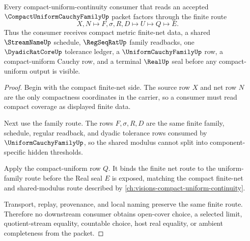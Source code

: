 \begin{theorem}
\label{thm:compact-uniform-cauchy-family-vision-route}
Every compact-uniform-continuity consumer that reads an accepted $\CompactUniformCauchyFamilyUp$ packet factors through the finite route
$$
X,N \longmapsto F,\sigma,R,D \longmapsto U \longmapsto Q \longmapsto E .
$$
Thus the consumer receives compact metric finite-net data, a shared $\StreamNameUp$ schedule, $\RegSeqRatUp$ family readbacks, one $\DyadicRatCoreUp$ tolerance ledger, a $\UniformCauchyFamilyUp$ row, a compact-uniform Cauchy row, and a terminal $\RealUp$ seal before any compact-uniform output is visible.
\end{theorem}
\begin{proof}
Begin with the compact finite-net side. The source row $X$ and net row $N$ are the only compactness coordinates in the carrier, so a consumer must read compact coverage as displayed finite data.

Next use the family route. The rows $F,\sigma,R,D$ are the same finite family, schedule, regular readback, and dyadic tolerance rows consumed by $\UniformCauchyFamilyUp$, so the shared modulus cannot split into component-specific hidden thresholds.

Apply the compact-uniform row $Q$. It binds the finite net route to the uniform-family route before the Real seal $E$ is exposed, matching the compact finite-net and shared-modulus route described by \autoref{ch:visions-compact-uniform-continuity}.

Transport, replay, provenance, and local naming preserve the same finite route. Therefore no downstream consumer obtains open-cover choice, a selected limit, quotient-stream equality, countable choice, host real equality, or ambient completeness from the packet.
\end{proof}


